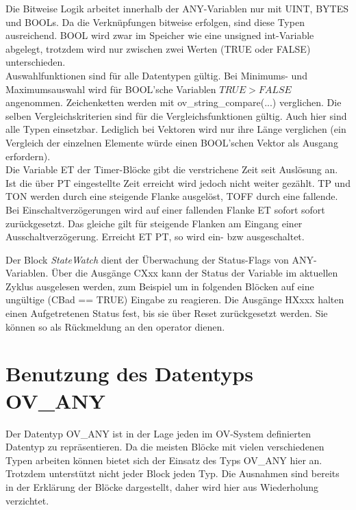 Die Bitweise Logik arbeitet innerhalb der ANY-Variablen nur mit UINT, BYTES und BOOLs. Da die Verknüpfungen bitweise erfolgen, sind diese Typen ausreichend. BOOL wird zwar im Speicher wie eine unsigned int-Variable abgelegt, trotzdem wird nur zwischen zwei Werten (TRUE oder FALSE) unterschieden.\\

Auswahlfunktionen sind für alle Datentypen gültig. Bei Minimums- und Maximumsauswahl wird für BOOL'sche Variablen $TRUE > FALSE$ angenommen. Zeichenketten werden mit ov\_string\_compare(...) verglichen. Die selben Vergleichskriterien sind für die Vergleichsfunktionen gültig. Auch hier sind alle Typen einsetzbar. Lediglich bei Vektoren wird nur ihre Länge verglichen (ein Vergleich der einzelnen Elemente würde einen BOOL'schen Vektor als Ausgang erfordern).\\

Die Variable ET der Timer-Blöcke gibt die verstrichene Zeit seit Auslösung an. Ist die über PT eingestellte Zeit erreicht wird jedoch nicht weiter gezählt. TP und TON werden durch eine steigende Flanke ausgelöst, TOFF durch eine fallende.\\
Bei Einschaltverzögerungen wird auf einer fallenden Flanke ET sofort sofort zurückgesetzt. Das gleiche gilt für steigende Flanken am Eingang einer Ausschaltverzögerung. Erreicht ET PT, so wird ein- bzw ausgeschaltet.\\

\vspace{2cm}

Der Block \textit{StateWatch} dient der Überwachung der Status-Flags von ANY-Variablen. Über die Ausgänge CXxx kann der Status der Variable im aktuellen Zyklus ausgelesen werden, zum Beispiel um in folgenden Blöcken auf eine ungültige (CBad == TRUE) Eingabe zu reagieren. Die Ausgänge HXxxx halten einen Aufgetretenen Status fest, bis sie über Reset zurückgesetzt werden. Sie können so als Rückmeldung an den operator dienen.\\

\section{Benutzung des Datentyps OV\_ANY}

Der Datentyp OV\_ANY ist in der Lage jeden im OV-System definierten Datentyp zu repräsentieren. Da die meisten Blöcke mit vielen verschiedenen Typen arbeiten können bietet sich der Einsatz des Typs OV\_ANY hier an. Trotzdem unterstützt nicht jeder Block jeden Typ. Die Ausnahmen sind bereits in der Erklärung der Blöcke dargestellt, daher wird hier aus Wiederholung verzichtet.\\

